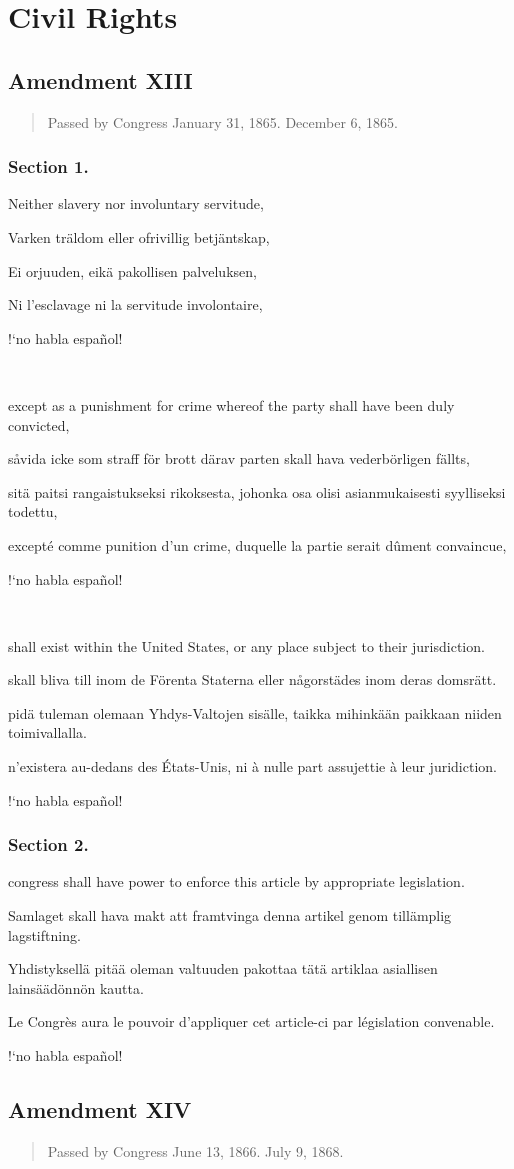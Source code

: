 \documentclass[a4paper,landscape,10pt]{article}
\newcommand{\tblock}[5]{\noindent\begin{minipage}[t]{0.18\textwidth}\foreignlanguage{english}{#1}\end{minipage}\hskip 0.025\textwidth\begin{minipage}[t]{0.18\textwidth}\foreignlanguage{swedish}{#2}\end{minipage}\hskip 0.025\textwidth\begin{minipage}[t]{0.18\textwidth}\foreignlanguage{finnish}{#3}\end{minipage}\hskip 0.025\textwidth\begin{minipage}[t]{0.18\textwidth}\foreignlanguage{french}{#4}\end{minipage}\hskip 0.025\textwidth\begin{minipage}[t]{0.18\textwidth}\foreignlanguage{spanish}{#5}\end{minipage}}
\begin{document}
\section*{Civil Rights}
\subsection*{Amendment XIII}
\begin{quote}\small
	Passed by Congress January 31, 1865.  December 6, 1865.
\end{quote}
\subsubsection*{Section 1.}
\tblock
{Neither slavery nor involuntary servitude,}
{Varken träldom eller ofrivillig betjäntskap,}
{Ei orjuuden, eikä pakollisen palveluksen,}
{Ni l'esclavage ni la servitude involontaire,}
{!`no habla español!}

~

\tblock
{except as a punishment for crime whereof the party shall have been duly convicted,}
{såvida icke som straff för brott därav parten skall hava vederbörligen fällts,}
{sitä paitsi rangaistukseksi rikoksesta, johonka osa olisi asianmukaisesti syylliseksi todettu,}
{excepté comme punition d'un crime, duquelle la partie serait dûment convaincue,}
{!`no habla español!}

~

\tblock
{shall exist within the United States, or any place subject to their jurisdiction.}
{skall bliva till inom de Förenta Staterna eller någorstädes inom deras domsrätt.}
{pidä tuleman olemaan Yhdys-Valtojen sisälle, taikka mihinkään paikkaan niiden toimivallalla.}
{n'existera au-dedans des États-Unis, ni à nulle part assujettie à leur juridiction.}
{!`no habla español!}


\subsubsection*{Section 2.}
\tblock
{\Gls{congress} shall have power to enforce this article by appropriate legislation.}
{Samlaget skall hava makt att framtvinga denna artikel genom tillämplig lagstiftning.}
{Yhdistyksellä pitää oleman valtuuden pakottaa tätä artiklaa asiallisen lainsäädönnön kautta.}
{Le Congrès aura le pouvoir d'appliquer cet article-ci par législation convenable.}
{!`no habla español!}



\subsection*{Amendment XIV}
\begin{quote}\small
	Passed by Congress June 13, 1866.  July 9, 1868.
\end{quote}
\end{document}

